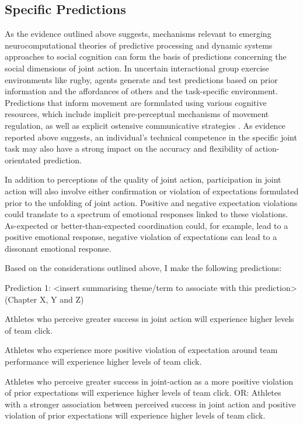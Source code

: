 \begin{CJK}{UTF8}{gbsn}
{\clearpage

\section{Specific Predictions}
  As the evidence outlined above suggests, mechanisms relevant to emerging neurocomputational theories of predictive processing and dynamic systems approaches to social cognition can form the basis of predictions concerning the social dimensions of joint action.  In uncertain interactional group exercise environments like rugby, agents generate and test predictions based on prior information and the affordances of others and the task-specific environment.  Predictions that inform movement are formulated using various cognitive resources, which include implicit pre-perceptual mechanisms of movement regulation, as well as explicit ostensive communicative strategies \citep{Semin2008,Frith2010}.  As evidence reported above suggests, an individual's technical competence in the specific joint task may also have a strong impact on the accuracy and flexibility of action-orientated prediction.

 In addition to perceptions of the quality of joint action, participation in joint action will also involve either confirmation or violation of expectations formulated prior to the unfolding of joint action. Positive and negative expectation violations could translate to a spectrum of emotional responses linked to these violations.  As-expected or better-than-expected coordination could, for example, lead to a positive emotional response, negative violation of expectations can lead to a dissonant emotional response.

  Based on the considerations outlined above, I make the following predictions:

  \begin{indent}
    \begin{description}
Prediction 1: <insert summarising theme/term to associate with this prediction> (Chapter X, Y and Z)
      \item [Prediction 1.a] Athletes who perceive greater success in joint action will experience higher levels of team click.
      \item [Prediction 1.b] Athletes who experience more positive violation of expectation around team performance will experience higher levels of team click.
      \item [Prediction 1.c] Athletes who perceive greater success in joint-action as a more positive violation of prior expectations will experience higher levels of team click. OR: Athletes with a stronger association between perceived success in joint action and positive violation of prior expectations will experience higher levels of team click.  \\
    \end{description}
  \end{indent}

}
\end{CJK}
